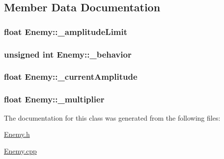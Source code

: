 \subsection{Member Data Documentation}
\hypertarget{class_enemy_ae05acccfefed105855fa5a7461785757}{
\subsubsection[{\_\-amplitudeLimit}]{\setlength{\rightskip}{0pt plus 5cm}float {\bf Enemy::\_\-amplitudeLimit}}}
\label{dd/d7a/class_enemy_ae05acccfefed105855fa5a7461785757}
\hypertarget{class_enemy_a4d3938717ffc4bd2078e9033490d3b8f}{
\subsubsection[{\_\-behavior}]{\setlength{\rightskip}{0pt plus 5cm}unsigned int {\bf Enemy::\_\-behavior}}}
\label{dd/d7a/class_enemy_a4d3938717ffc4bd2078e9033490d3b8f}
\hypertarget{class_enemy_aa3a2a0d5590a8acae7b387aa0e19eacd}{
\subsubsection[{\_\-currentAmplitude}]{\setlength{\rightskip}{0pt plus 5cm}float {\bf Enemy::\_\-currentAmplitude}}}
\label{dd/d7a/class_enemy_aa3a2a0d5590a8acae7b387aa0e19eacd}
\hypertarget{class_enemy_a406a6763891be117437959060c9c1fba}{
\subsubsection[{\_\-multiplier}]{\setlength{\rightskip}{0pt plus 5cm}float {\bf Enemy::\_\-multiplier}}}
\label{dd/d7a/class_enemy_a406a6763891be117437959060c9c1fba}


The documentation for this class was generated from the following files:\begin{DoxyCompactItemize}
\item 
\hyperlink{_enemy_8h}{Enemy.h}\item 
\hyperlink{_enemy_8cpp}{Enemy.cpp}\end{DoxyCompactItemize}
